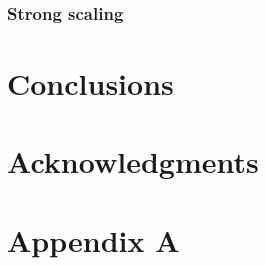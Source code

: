 \documentclass{sig-alternate}
\begin{document}
\subsubsection{Strong scaling}






\section{Conclusions}

\section{Acknowledgments}

%

%
%
\appendix
\section{Appendix A}

\end{document}
